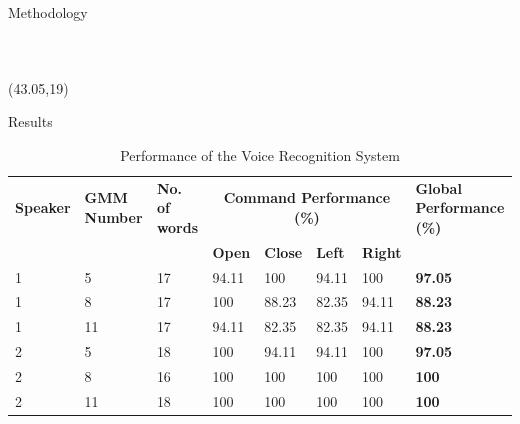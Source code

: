 \documentclass[final]{beamer}
\begin{document}
\begin{frame}{}
\begin{textblock}{39.5}
\begin{block}{Methodology}
\begin{columns}[t]
\begin{figure}
\end{figure}
\end{columns}
\end{block}


\end{textblock}

\begin{textblock}{39.5}(43.05,19)

\begin{block}{Results}

\begin{table}[h]
\centering
\footnotesize
\begin{tabular}{||p{3.5cm}||p{4cm}||p{3cm}||p{4cm}||p{4cm}||p{4cm}||p{4cm}||p{6cm}||}%
\hline 
\textbf{Speaker} &  \textbf{GMM Number} & \textbf{No. of words} & \multicolumn{4}{|c||}{\textbf{Command Performance (\%)}} & \textbf{Global Performance (\%)}\\
\cline{4-7}
& & & \textbf{Open} & \textbf{Close} & \textbf{Left} & \textbf{Right} & \\
\hline \hline

1 &5 &17 &94.11 &100 &94.11 &100 & \textbf{97.05} \\
\hline 
1 &8 &17 &100 &88.23 &82.35 &94.11 &\textbf{88.23} \\
\hline
1 &11 &17 &94.11 &82.35 &82.35 &94.11 &\textbf{88.23} \\
\hline
2 &5 &18 &100 &94.11 &94.11 &100 & \textbf{97.05}\\
\hline
2 &8 &16 &100 &100 &100 &100 & \textbf{100}\\
\hline
2 &11 &18 &100 &100 &100 &100 & \textbf{100}\\
\hline

\end{tabular}
\caption{Performance of the Voice Recognition System}
\label{performance}
\end{table}


\end{block}
\end{textblock}
\end{frame}
\end{document}
